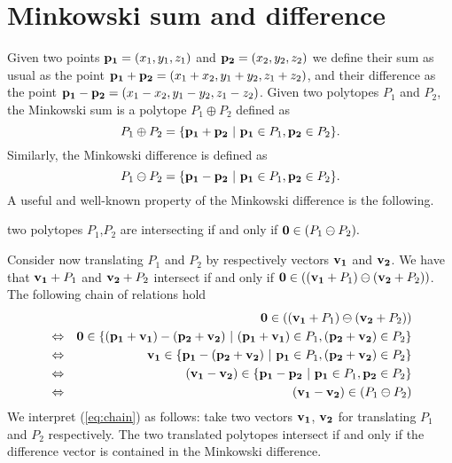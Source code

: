 \section{Minkowski sum and difference}

Given two points $\mathbf{p_1} = (x_1, y_1, z_1)$ and $\mathbf{p_2} = (x_2, y_2, z_2)$ we define
their sum as usual as the point 
$\mathbf{p_1} + \mathbf{p_2} = (x_1+x_2, y_1+y_2, z_1+z_2)$,
and their difference as the point
$\mathbf{p_1} - \mathbf{p_2} = (x_1-x_2, y_1-y_2, z_1-z_2)$.
Given two polytopes $P_1$ and $P_2$, the Minkowski sum is a polytope $P_1 \oplus P_2$
defined as
$$
P_1 \oplus  P_2 = \{ \mathbf{p_1} + \mathbf{p_2} \ \vert\ \mathbf{p_1} \in P_1, \mathbf{p_2} \in P_2 \}.
$$
Similarly, the Minkowski difference is defined as
$$
P_1 \ominus P_2 = \{ \point{p_1} - \point{p_2} \ \vert\ \point{p_1} \in P_1, \point{p_2} \in P_2 \}.
$$
A useful and well-known property of the Minkowski difference is the following. 
\begin{property}
\label{pro:mink}
two polytopes $P_1$,$P_2$ 
are intersecting if and only if 
$\mathbf{0} \in (P_1 \ominus P_2).$
\end{property}

Consider now translating $P_1$ and $P_2$ by
respectively vectors $\mathbf{v_1}$ and $\mathbf{v_2}$. 
We have that $\mathbf{v_1}+P_1$ and $\mathbf{v_2}+P_2$
intersect if and only if 
$\mathbf{0} \in ((\mathbf{v_1}+P_1) \ominus (\mathbf{v_2}+P_2))$.
The following chain of relations hold
\begin{eqnarray}
\nonumber
& & \mathbf{0} \in ((\mathbf{v_1}+P_1) \ominus (\mathbf{v_2}+P_2)) \\
\nonumber
& \Leftrightarrow & \mathbf{0} \in \{ (\mathbf{p_1}+\mathbf{v_1}) - (\mathbf{p_2}+\mathbf{v_2}) \ \vert\ (\mathbf{p_1} + \mathbf{v_1}) \in P_1, (\mathbf{p_2} + \mathbf{v_2}) \in P_2 \} \\
\nonumber
& \Leftrightarrow & \mathbf{v_1} \in \{ \mathbf{p_1} - (\mathbf{p_2}+\mathbf{v_2}) \ \vert\ \mathbf{p_1} \in P_1, (\mathbf{p_2} + \mathbf{v_2}) \in P_2 \} \\
\nonumber
& \Leftrightarrow & (\mathbf{v_1} - \mathbf{v_2}) \in \{ \mathbf{p_1} - \mathbf{p_2} \ \vert\ \mathbf{p_1} \in P_1, \mathbf{p_2} \in P_2 \} \\
\label{eq:chain}
& \Leftrightarrow & (\mathbf{v_1} - \mathbf{v_2}) \in (P_1 \ominus P_2)
\end{eqnarray}
We interpret (\ref{eq:chain}) as follows: take two vectors 
$\mathbf{v_1}$, $\mathbf{v_2}$ for translating
$P_1$ and $P_2$ respectively. The two translated polytopes 
intersect if and only if the difference
vector is contained in the Minkowski difference.

